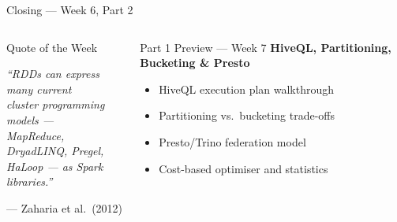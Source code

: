 \documentclass[aspectratio=169,10pt]{beamer}
\begin{document}
\begin{frame}{Closing — Week 6, Part 2}
\begin{columns}[T]
      \begin{alertblock}{Quote of the Week}
        \begin{center}
        \large\itshape
        ``RDDs can express many current\\
        cluster programming models —\\
        MapReduce, DryadLINQ, Pregel,\\
        HaLoop — as Spark libraries.''
        \end{center}
        \begin{flushright}
        \small --- Zaharia et al.\ (2012)
        \end{flushright}
      \end{alertblock}
      \vspace{6pt}
      \begin{exampleblock}{Part 1 Preview — Week 7}
        \textbf{HiveQL, Partitioning, Bucketing \& Presto}\\[3pt]
        \begin{itemize}\setlength\itemsep{1pt}
          \item HiveQL execution plan walkthrough
          \item Partitioning vs.\ bucketing trade-offs
          \item Presto/Trino federation model
          \item Cost-based optimiser and statistics
        \end{itemize}
      \end{exampleblock}
  \end{columns}
\end{frame}

\end{document}
